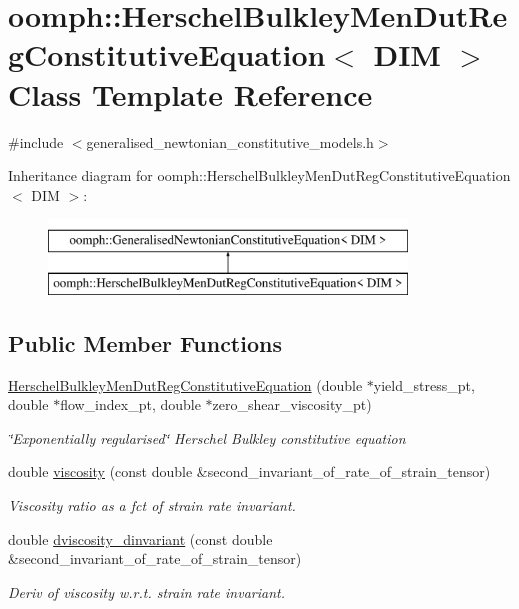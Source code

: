 \hypertarget{classoomph_1_1HerschelBulkleyMenDutRegConstitutiveEquation}{}\section{oomph\+:\+:Herschel\+Bulkley\+Men\+Dut\+Reg\+Constitutive\+Equation$<$ D\+IM $>$ Class Template Reference}
\label{classoomph_1_1HerschelBulkleyMenDutRegConstitutiveEquation}


{\ttfamily \#include $<$generalised\+\_\+newtonian\+\_\+constitutive\+\_\+models.\+h$>$}

Inheritance diagram for oomph\+:\+:Herschel\+Bulkley\+Men\+Dut\+Reg\+Constitutive\+Equation$<$ D\+IM $>$\+:\begin{figure}[H]
\begin{center}
\leavevmode
\includegraphics[height=2.000000cm]{classoomph_1_1HerschelBulkleyMenDutRegConstitutiveEquation}
\end{center}
\end{figure}
\subsection*{Public Member Functions}
\begin{DoxyCompactItemize}
\item 
\hyperlink{classoomph_1_1HerschelBulkleyMenDutRegConstitutiveEquation_a37aecc4b74de5f30b57ad56f237d9079}{Herschel\+Bulkley\+Men\+Dut\+Reg\+Constitutive\+Equation} (double $\ast$yield\+\_\+stress\+\_\+pt, double $\ast$flow\+\_\+index\+\_\+pt, double $\ast$zero\+\_\+shear\+\_\+viscosity\+\_\+pt)
\begin{DoxyCompactList}\small\item\em \char`\"{}\+Exponentially regularised\char`\"{} Herschel Bulkley constitutive equation \end{DoxyCompactList}\item 
double \hyperlink{classoomph_1_1HerschelBulkleyMenDutRegConstitutiveEquation_acd2e8cb9f733c39736294631dabe61dd}{viscosity} (const double \&second\+\_\+invariant\+\_\+of\+\_\+rate\+\_\+of\+\_\+strain\+\_\+tensor)
\begin{DoxyCompactList}\small\item\em Viscosity ratio as a fct of strain rate invariant. \end{DoxyCompactList}\item 
double \hyperlink{classoomph_1_1HerschelBulkleyMenDutRegConstitutiveEquation_a7329879e20bf130cfb1f94d19d62b440}{dviscosity\+\_\+dinvariant} (const double \&second\+\_\+invariant\+\_\+of\+\_\+rate\+\_\+of\+\_\+strain\+\_\+tensor)
\begin{DoxyCompactList}\small\item\em Deriv of viscosity w.\+r.\+t. strain rate invariant. \end{DoxyCompactList}\end{DoxyCompactItemize}
